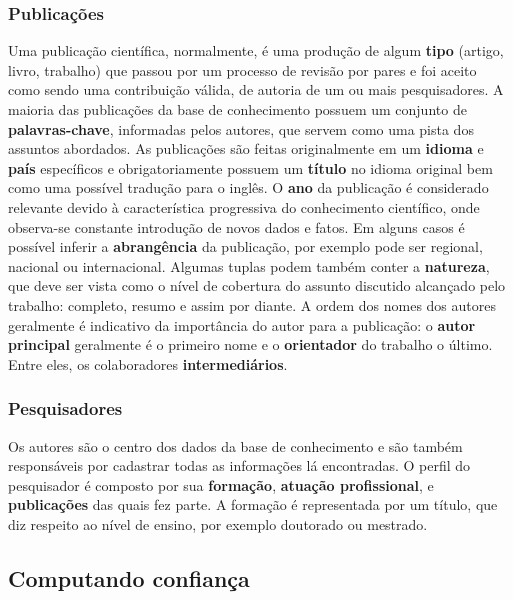 \documentclass[12pt]{article}
\begin{document}
\subsubsection{Publicações}

Uma publicação científica, normalmente, é uma produção de algum \textbf{tipo} (artigo, livro, trabalho) que passou por um processo de 
revisão por pares e foi aceito como sendo uma contribuição válida, de autoria de um ou mais pesquisadores. A maioria das 
publicações da base de conhecimento possuem um conjunto de \textbf{palavras-chave}, informadas pelos autores, que servem como uma pista 
dos assuntos abordados. As publicações são feitas originalmente em um \textbf{idioma} e \textbf{país} específicos e 
obrigatoriamente possuem um \textbf{título} no idioma original bem como uma possível tradução para o inglês. O \textbf{ano} da 
publicação é considerado relevante devido à característica progressiva do conhecimento científico, onde observa-se constante 
introdução de novos dados e fatos. Em alguns casos é possível inferir a \textbf{abrangência} da publicação, por exemplo pode 
ser regional, nacional ou internacional. Algumas tuplas podem também conter a \textbf{natureza}, que deve ser vista como o 
nível de cobertura do assunto discutido alcançado pelo trabalho: completo, resumo e assim por diante. A ordem dos nomes dos 
autores geralmente é indicativo da importância do autor para a publicação: o \textbf{autor principal} geralmente é o primeiro 
nome e o \textbf{orientador} do trabalho o último. Entre eles, os colaboradores \textbf{intermediários}.  

\subsubsection{Pesquisadores}

Os autores são o centro dos dados da base de conhecimento e são também responsáveis por cadastrar todas as informações lá 
encontradas. O perfil do pesquisador é composto por sua \textbf{formação}, \textbf{atuação profissional}, e 
\textbf{publicações} das quais fez parte. A formação é representada por um título, que diz respeito ao nível de ensino, por 
exemplo doutorado ou mestrado. 

\newpage

\subsection{Computando confiança} \label{sect:computing-trust}
\end{document}
